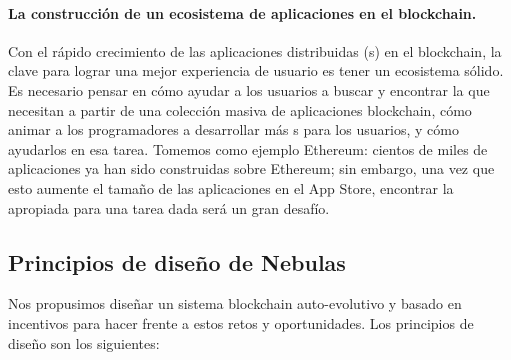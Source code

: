 \paragraph{La construcción de un ecosistema de aplicaciones en el blockchain.} Con el rápido crecimiento de las aplicaciones distribuidas ({\dapp}s) en el blockchain, la clave para lograr una mejor experiencia de usuario es tener un ecosistema sólido. Es necesario pensar en cómo ayudar a los usuarios a buscar y encontrar la {\dapp} que necesitan a partir de una colección masiva de aplicaciones blockchain, cómo animar a los programadores a desarrollar más {\dapp}s para los usuarios, y cómo ayudarlos en esa tarea. Tomemos como ejemplo Ethereum: cientos de miles de aplicaciones ya han sido construidas sobre Ethereum; sin embargo, una vez que esto aumente el tamaño de las aplicaciones en el App Store, encontrar la {\dapp} apropiada para una tarea dada será un gran desafío.

\subsection{Principios de diseño de Nebulas}

Nos propusimos diseñar un sistema blockchain auto-evolutivo y basado en incentivos para hacer frente a estos retos y oportunidades. Los principios de diseño son los siguientes:

